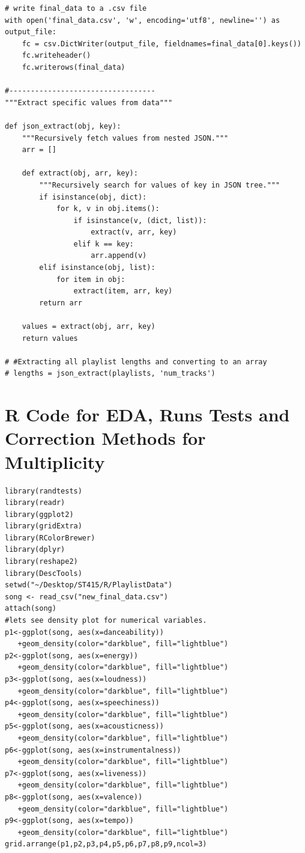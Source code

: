 \documentclass[12pt]{article}
\theoremstyle{plain}
\theoremstyle{definition}
\theoremstyle{remark}
\begin{document}
\begin{appendices}
\begin{verbatim}
# write final_data to a .csv file
with open('final_data.csv', 'w', encoding='utf8', newline='') as output_file:
    fc = csv.DictWriter(output_file, fieldnames=final_data[0].keys())
    fc.writeheader()
    fc.writerows(final_data)

#----------------------------------
"""Extract specific values from data"""

def json_extract(obj, key):
    """Recursively fetch values from nested JSON."""
    arr = []

    def extract(obj, arr, key):
        """Recursively search for values of key in JSON tree."""
        if isinstance(obj, dict):
            for k, v in obj.items():
                if isinstance(v, (dict, list)):
                    extract(v, arr, key)
                elif k == key:
                    arr.append(v)
        elif isinstance(obj, list):
            for item in obj:
                extract(item, arr, key)
        return arr

    values = extract(obj, arr, key)
    return values

# #Extracting all playlist lengths and converting to an array
# lengths = json_extract(playlists, 'num_tracks')
\end{verbatim}
\section{R Code for EDA, Runs Tests and Correction Methods for Multiplicity}
\begin{verbatim}
library(randtests)
library(readr)
library(ggplot2)
library(gridExtra)
library(RColorBrewer)
library(dplyr)
library(reshape2)
library(DescTools)
setwd("~/Desktop/ST415/R/PlaylistData")
song <- read_csv("new_final_data.csv")
attach(song)
#lets see density plot for numerical variables.
p1<-ggplot(song, aes(x=danceability))
   +geom_density(color="darkblue", fill="lightblue")
p2<-ggplot(song, aes(x=energy))
   +geom_density(color="darkblue", fill="lightblue")
p3<-ggplot(song, aes(x=loudness))
   +geom_density(color="darkblue", fill="lightblue")
p4<-ggplot(song, aes(x=speechiness))
   +geom_density(color="darkblue", fill="lightblue")
p5<-ggplot(song, aes(x=acousticness))
   +geom_density(color="darkblue", fill="lightblue")
p6<-ggplot(song, aes(x=instrumentalness))
   +geom_density(color="darkblue", fill="lightblue")
p7<-ggplot(song, aes(x=liveness))
   +geom_density(color="darkblue", fill="lightblue")
p8<-ggplot(song, aes(x=valence))
   +geom_density(color="darkblue", fill="lightblue")
p9<-ggplot(song, aes(x=tempo))
   +geom_density(color="darkblue", fill="lightblue")
grid.arrange(p1,p2,p3,p4,p5,p6,p7,p8,p9,ncol=3)


\end{verbatim}
\end{appendices}
\end{document}
